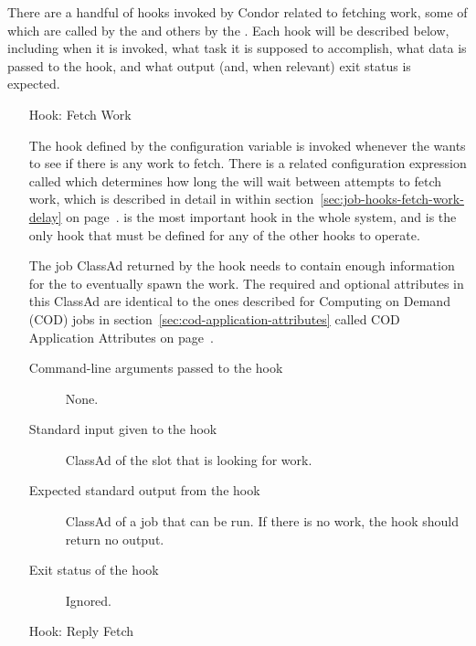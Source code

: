 There are a handful of hooks invoked by Condor related to fetching
work, some of which are called by the  and others by
the .
Each hook will be described below, including when it is invoked, what
task it is supposed to accomplish, what data is passed to the hook,
and what output (and, when relevant) exit status is expected.


\begin{itemize}
\item[Hook: Fetch Work]

The hook defined by the configuration variable
 is invoked whenever the 
wants to see if there is any work to fetch.
There is a related configuration expression called
 which determines how long the 
will wait between attempts to fetch work, which is described in detail
in within section~\ref{sec:job-hooks-fetch-work-delay} on
page~\pageref{sec:job-hooks-fetch-work-delay}.
 is the most important hook in the whole
system, and is the only hook that must be defined for any of the other
 hooks to operate.

The job ClassAd returned by the hook needs to contain enough
information for the  to eventually spawn the work.
The required and optional attributes in this ClassAd are identical to
the ones described for Computing on Demand (COD) jobs in
section~\ref{sec:cod-application-attributes} 
called COD Application Attributes on
page~\pageref{sec:cod-application-attributes}.

\begin{description}
\item[Command-line arguments passed to the hook]
  None.

\item[Standard input given to the hook]
  ClassAd of the slot that is looking for work.

\item[Expected standard output from the hook]
  ClassAd of a job that can be run.
  If there is no work, the hook should return no output.

\item[Exit status of the hook]
  Ignored.
\end{description}


\item[Hook: Reply Fetch]


\end{itemize}
